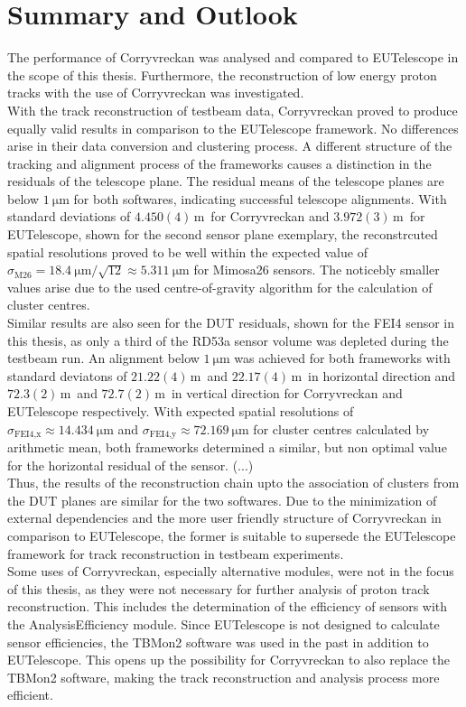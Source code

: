 \chapter{Summary and Outlook}
The performance of Corryvreckan was analysed and compared to EUTelescope in the scope of this thesis. Furthermore, the reconstruction of low energy proton
tracks with the use of Corryvreckan was investigated.\\
With the track reconstruction of testbeam data, Corryvreckan proved to produce equally valid results in comparison to the EUTelescope framework. No differences
arise in their data conversion and clustering process. A different structure of the tracking and alignment process of the frameworks causes a distinction in the residuals
of the telescope plane. The residual means of the telescope planes are below $\SI{1}{\micro\meter}$ for both softwares, indicating successful telescope alignments.
With standard deviations of $4.450(4)$\,\textmu m\, for Corryvreckan and $3.972(3)$\,\textmu m\, for EUTelescope, shown for the second sensor plane exemplary, the
reconstrcuted spatial resolutions proved to be well within
the expected value of $\sigma_{\text{M26}} = \SI{18.4}{\micro\meter}/\sqrt{12} \approx \SI{5.311}{\micro\meter}$ for Mimosa26 sensors. The noticebly smaller values
arise due to the used centre-of-gravity algorithm for the calculation of cluster centres. \\
Similar results are also seen for the DUT residuals, shown for the FEI4 sensor in this thesis, as only a third of the RD53a sensor volume was depleted during the testbeam run.
An alignment below $\SI{1}{\micro\meter}$ was achieved for both frameworks with standard deviatons of $21.22(4)$\,\textmu m\, and $22.17(4)$\,\textmu m\, in horizontal direction and
$72.3(2)$\,\textmu m\, and $72.7(2)$\,\textmu m\, in vertical direction for Corryvreckan and EUTelescope respectively. With expected spatial resolutions of
$\sigma_{\text{FEI4},\text{x}} \approx \SI{14.434}{\micro\meter}$ and $\sigma_{\text{FEI4},\text{y}} \approx \SI{72.169}{\micro\meter}$ for cluster centres calculated by
arithmetic mean, both frameworks determined a similar, but non optimal value for the horizontal residual of the sensor. (...) \\
Thus, the results of the reconstruction chain upto the
association of clusters from the DUT planes are similar for the two softwares. Due to the minimization of external dependencies and the more user friendly structure of
Corryvreckan in comparison to EUTelescope, the former is suitable to supersede the EUTelescope framework for track reconstruction in testbeam experiments. \\
Some uses of Corryvreckan, especially alternative modules, were not in the focus of this thesis,
as they were not necessary for further analysis of proton track reconstruction. This includes the determination of the
efficiency of sensors with the AnalysisEfficiency module. Since EUTelescope is not designed to calculate sensor efficiencies, the TBMon2 software was used in the past in addition
to EUTelescope. This opens up the possibility for Corryvreckan to also replace the TBMon2 software, making the track reconstruction and analysis process more efficient.

